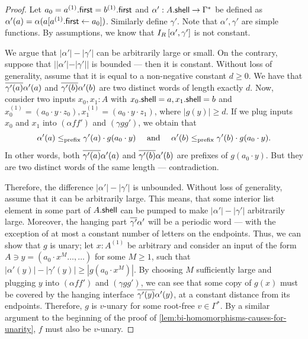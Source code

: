 \begin{proof}
    Let $a_0 = a^{(1)} . \mathsf{first} = b^{(1)} . \mathsf{first}$ and $\alpha' : A . \mathsf{shell} \to \Gamma^*$ be defined as $\alpha'(a) = \alpha(a[a^{(1)} . \mathsf{first} \leftarrow a_0])$. Similarly define $\gamma'$. Note that $\alpha', \gamma'$ are simple functions.  By assumptions, we know that $I_R \left[ \alpha', \gamma' \right]$ is not constant.

    We argue that $|\alpha'| - |\gamma'|$ can be arbitrarily large or small. On the contrary, suppose that $||\alpha'| - |\gamma'||$ is bounded --- then it is constant.  Without loss of generality, assume that it is equal to a non-negative constant $d \geq 0$. We have that $\overline{\gamma'(a)}\alpha'(a)$ and $\overline{\gamma'(b)}\alpha'(b)$ are two distinct words of length exactly $d$. Now, consider two inputs $x_0, x_1 : A$ with $x_0 . \mathsf{shell} = a, x_1 . \mathsf{shell} = b$ and $x_0^{(1)} = (a_0 \cdot y \cdot z_0), x_1^{(1)} = (a_0 \cdot y \cdot z_1)$, where $|g(y)| \geq d$. If we plug inputs $x_0$ and $x_1$ into $(\alpha f f')$ and $(\gamma g g')$, we obtain that
    \[
        \alpha'(a) \leq_{\mathrm{prefix}} \gamma'(a) \cdot g(a_0 \cdot y) \quad \text{ and } \quad \alpha'(b) \leq_{\mathrm{prefix}} \gamma'(b) \cdot g(a_0 \cdot y).
    \]
    In other words, both $\overline{\gamma'(a)}\alpha'(a)$ and $\overline{\gamma'(b)}\alpha'(b)$ are prefixes of $g(a_0 \cdot y)$. But they are two distinct words of the same length --- contradiction.

    Therefore, the difference $|\alpha'| - |\gamma'|$ is unbounded. Without loss of generality, assume that it can be arbitrarily large.  This means, that some interior list element in some part of $A . \mathsf{shell}$ can be pumped to make $|\alpha'| - |\gamma'|$ arbitrarily large. Moreover, the hanging part $\overline{\gamma'}\alpha'$ will be a periodic word --- with the exception of at most a constant number of letters on the endpoints. Thus, we can show that $g$ is unary; let $x : A^{(1)}$ be arbitrary and consider an input of the form $A \ni y = (a_0 \cdot x^M \dots, \dots)$ for some $M \geq 1$, such that $|\alpha'(y)| - |\gamma'(y)| \geq |g(a_0 \cdot x^M)|$. By choosing $M$ sufficiently large and plugging $y$ into $(\alpha f f')$ and $(\gamma g g')$, we can see that some copy of $g(x)$ must be covered by the hanging interface $\overline{\gamma'(y)} \alpha'(y)$, at a constant distance from its endpoints. Therefore, $g$ is $v$-unary for some root-free $v \in \Gamma^*$. By a similar argument to the beginning of the proof of \cref{lem:bi-homomorphisms-causes-for-unarity}, $f$ must also be $v$-unary. 
\end{proof}

